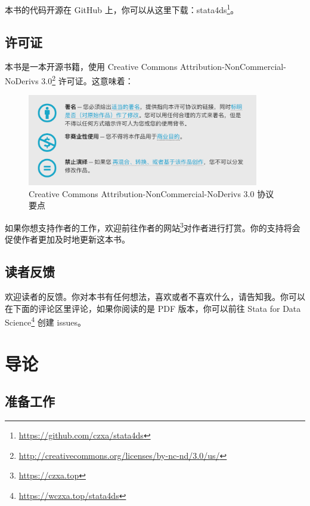 \documentclass[]{ctexbook}
\renewcommand{\href}[2]{#2\footnote{\url{#1}}}
\begin{document}
本书的代码开源在 GitHub 上，你可以从这里下载：\href{https://github.com/czxa/stata4ds}{stata4ds}。

\hypertarget{section-6}{%
\section{许可证}\label{section-6}}

本书是一本开源书籍，使用 \href{http://creativecommons.org/licenses/by-nc-nd/3.0/us/}{Creative Commons Attribution-NonCommercial-NoDerivs 3.0} 许可证。这意味着：

\begin{figure}

{\centering \includegraphics[width=0.9\textwidth]{assets/license} 

}

\caption{Creative Commons Attribution-NonCommercial-NoDerivs 3.0 协议要点}\label{fig:cca}
\end{figure}

如果你想支持作者的工作，欢迎前往\href{https://czxa.top}{作者的网站}对作者进行打赏。你的支持将会促使作者更加及时地更新这本书。

\hypertarget{section-7}{%
\section{读者反馈}\label{section-7}}

欢迎读者的反馈。你对本书有任何想法，喜欢或者不喜欢什么，请告知我。你可以在下面的评论区里评论，如果你阅读的是 PDF 版本，你可以前往 \href{https://wczxa.top/stata4ds}{Stata for Data Science} 创建 issues。

\mainmatter

\hypertarget{section-8}{%
\chapter{导论}\label{section-8}}

\hypertarget{section-9}{%
\section{准备工作}\label{section-9}}
\end{document}
